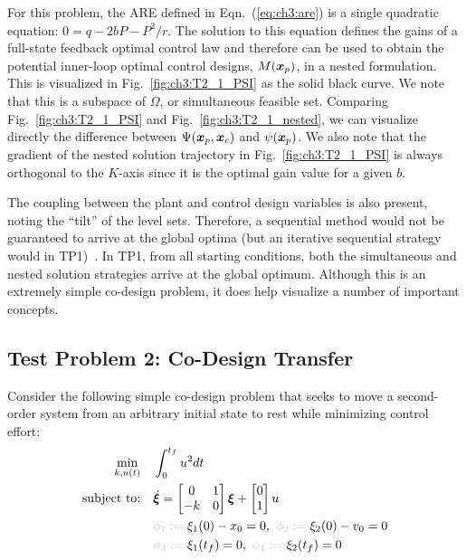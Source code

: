 For this problem, the ARE defined in Eqn.~(\ref{eq:ch3:are}) is a single quadratic equation: $0 = q - 2 b P - P^2/r$. The solution to this equation defines the gains of a full-state feedback optimal control law and therefore can be used to obtain the potential inner-loop optimal control designs, $M(\bm{x}_p)$, in a nested formulation. This is visualized in Fig.~\ref{fig:ch3:T2_1_PSI} as the solid black curve. We note that this is a subspace of $\Omega$, or simultaneous feasible set.
Comparing Fig.~\ref{fig:ch3:T2_1_PSI} and Fig.~\ref{fig:ch3:T2_1_nested}, we can visualize directly the difference between $\Psi(\bm{x}_p,\bm{x}_c)$ and $\psi(\bm{x}_p)$. We also note that the gradient of the nested solution trajectory in Fig.~\ref{fig:ch3:T2_1_PSI} is always orthogonal to the $K$-axis since it is the optimal gain value for a given $b$. 

The coupling between the plant and control design variables is also present, noting the ``tilt'' of the level sets. Therefore, a sequential method would not be guaranteed to arrive at the global optima (but an iterative sequential strategy would in TP1)~\cite{Fathy2001a}.
In TP1, from all starting conditions, both the simultaneous and nested solution strategies arrive at the global optimum.
Although this is an extremely simple co-design problem, it does help visualize a number of important concepts.



\subsection{Test Problem 2: Co-Design Transfer \label{sec:ch3:transfer}}

Consider the following simple co-design problem that seeks to move a second-order system from an arbitrary initial state to rest while minimizing control effort:
\begin{subequations}
\begin{align}
\min_{k,u(t)} \quad & \int_{0}^{t_f} u^2 dt \\
\text{subject to:} \quad & \dot{\bxi} = \begin{bmatrix} 0 & 1 \\ -k & 0 \end{bmatrix}\bxi + \begin{bmatrix} 0 \\ 1 \end{bmatrix} u \\
& \textcolor{light-gray}{\phi_1 := }\ \xi_1(0) - x_0 = 0, \ \textcolor{light-gray}{\phi_2 := }\  \xi_2(0) - v_0 = 0 \\
& \textcolor{light-gray}{\phi_3 := }\ \xi_1(t_f) = 0, \ \textcolor{light-gray}{\phi_4 := }\  \xi_2(t_f) = 0
\end{align}
\end{subequations}

